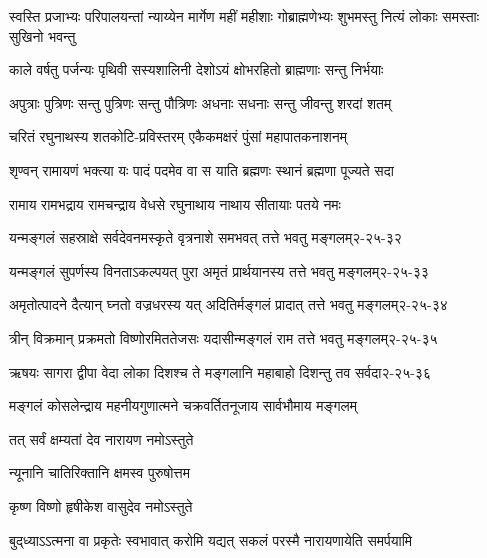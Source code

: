 
\fourlineindentedshloka
{स्वस्ति प्रजाभ्यः परिपालयन्तां}
{न्याय्येन मार्गेण महीं महीशाः}
{गोब्राह्मणेभ्यः शुभमस्तु नित्यं}
{लोकाः समस्ताः सुखिनो भवन्तु}

\twolineshloka
{काले वर्षतु पर्जन्यः पृथिवी सस्यशालिनी}
{देशोऽयं क्षोभरहितो ब्राह्मणाः सन्तु निर्भयाः}

\twolineshloka
{अपुत्राः पुत्रिणः सन्तु पुत्रिणः सन्तु पौत्रिणः}
{अधनाः सधनाः सन्तु जीवन्तु शरदां शतम्}

\twolineshloka
{चरितं रघुनाथस्य शतकोटि-प्रविस्तरम्}
{एकैकमक्षरं पुंसां महापातकनाशनम्}

\twolineshloka
{शृण्वन् रामायणं भक्त्या यः पादं पदमेव वा}
{स याति ब्रह्मणः स्थानं ब्रह्मणा पूज्यते सदा}

\twolineshloka
{रामाय रामभद्राय रामचन्द्राय वेधसे}
{रघुनाथाय नाथाय सीतायाः पतये नमः}

\annotwolineshloka
{यन्मङ्गलं सहस्राक्षे सर्वदेवनमस्कृते}
{वृत्रनाशे समभवत् तत्ते भवतु मङ्गलम्}{२-२५-३२}

\annotwolineshloka
{यन्मङ्गलं सुपर्णस्य विनताऽकल्पयत् पुरा}
{अमृतं प्रार्थयानस्य तत्ते भवतु मङ्गलम्}{२-२५-३३}

\annotwolineshloka
{अमृतोत्पादने दैत्यान् घ्नतो वज्रधरस्य यत्}
{अदितिर्मङ्गलं प्रादात् तत्ते भवतु मङ्गलम्}{२-२५-३४}

\annotwolineshloka
{त्रीन् विक्रमान् प्रक्रमतो विष्णोरमिततेजसः}
{यदासीन्मङ्गलं राम तत्ते भवतु मङ्गलम्}{२-२५-३५}

\annotwolineshloka
{ऋषयः सागरा द्वीपा वेदा लोका दिशश्च ते}
{मङ्गलानि महाबाहो दिशन्तु तव सर्वदा}{२-२५-३६}

\twolineshloka
{मङ्गलं कोसलेन्द्राय महनीयगुणात्मने}
{चक्रवर्तितनूजाय सार्वभौमाय मङ्गलम्}

{तत् सर्वं क्षम्यतां देव नारायण नमोऽस्तुते}

{न्यूनानि चातिरिक्तानि क्षमस्व पुरुषोत्तम}

{कृष्ण विष्णो हृषीकेश वासुदेव नमोऽस्तुते}

{बुद्‌ध्याऽऽत्मना वा प्रकृतेः स्वभावात्}
{करोमि यद्यत् सकलं परस्मै}
{नारायणायेति समर्पयामि}
